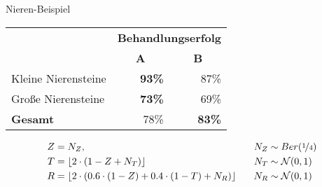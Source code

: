 \begin{frame}{Nieren-Beispiel}
    \begin{table}
        \begin{tabular}{lrr}
        \toprule
        ~      & \multicolumn{2}{c}{\textbf{Behandlungserfolg}}  \\
        \cmidrule{2-3}
        ~                   & \multicolumn{1}{c}{\textbf{A}} & \multicolumn{1}{c}{\textbf{B}} \\ \midrule
        Kleine Nierensteine & \textbf{93\%} & 87\% \\
        Große Nierensteine  & \textbf{73\%} & 69\% \\
        \textbf{Gesamt}     &          78\% & \textbf{83\%} \\
        \bottomrule
        \end{tabular}
    \end{table}

    \begin{figure}[!h]
        \centering
    \end{figure}

    \begin{align*}
        Z &= N_Z, \;\;\;& N_Z &\sim Ber(\nicefrac{1}{4})\\
        T &= \lfloor 2 \cdot (1-Z+N_T) \rfloor \;\;\; & N_T &\sim \mathcal{N}(0, 1)\\
        R &= \lfloor 2 \cdot (0.6 \cdot (1-Z) + 0.4 \cdot (1-T) + N_R) \rfloor  \;\;\; & N_R &\sim \mathcal{N}(0, 1)
    \end{align*}
\end{frame}


